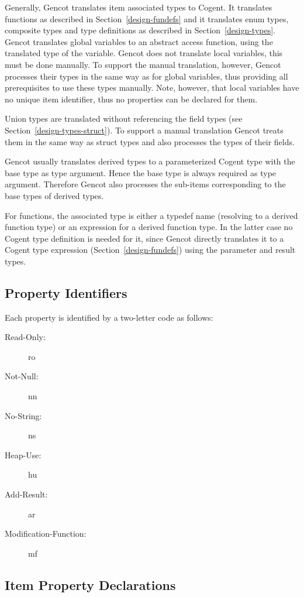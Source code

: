 Generally, Gencot translates item associated types to Cogent. It translates functions as described in Section~\ref{design-fundefs}
and it translates enum types, composite types and type definitions as described in Section~\ref{design-types}.
Gencot translates global variables to an abstract access function, using the translated type of the variable.
Gencot does not translate local variables, this must be done manually. To support the manual translation, 
however, Gencot processes their types in the same way as for global variables, thus providing all prerequisites
to use these types manually. Note, however, that local variables have no unique item identifier, thus no properties
can be declared for them.

Union types are translated without referencing the field types
(see Section~\ref{design-types-struct}). To support a manual translation Gencot treats them in 
the same way as struct types and also processes the types of their fields.

Gencot usually translates derived types to a parameterized Cogent type with the base type as type argument. Hence the base
type is always required as type argument. Therefore Gencot also processes the sub-items corresponding to the base types 
of derived types.

For functions, the associated type is either a typedef name (resolving to a derived function type) 
or an expression for a derived function type. In the latter case no Cogent type definition is needed for it, since Gencot
directly translates it to a Cogent type expression (Section~\ref{design-fundefs}) using the parameter and result types. 

\subsection{Property Identifiers}
\label{impl-itemprops-property}

Each property is identified by a two-letter code as follows:
\begin{description}
\item[Read-Only:] ro
\item[Not-Null:] nn
\item[No-String:] ns
\item[Heap-Use:] hu
\item[Add-Result:] ar
\item[Modification-Function:] mf
\end{description}

\subsection{Item Property Declarations}
\label{impl-itemprops-decl}

